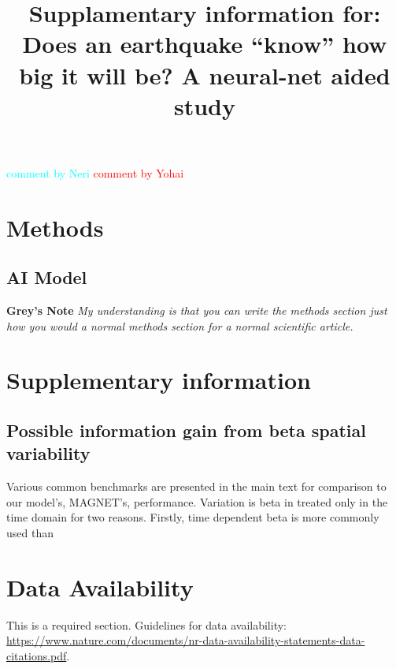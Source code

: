 \documentclass[pdflatex]{sn-jnl}
\newcommand{\yohai}[1]{{\textcolor{red}{#1}}}
\newcommand{\neri}[1]{{\textcolor{cyan}{#1}}}
\begin{document}
\title[Running Title]{Supplamentary information for: Does an earthquake “know” how big it will be? A neural-net aided study} %

\keywords{}

\maketitle

\neri{comment by Neri} \newline
\yohai{comment by Yohai}

\section{Methods}
\subsection{AI Model}
\textbf{Grey's Note} \textit{My understanding is that you can write the methods section just how you would a normal methods section for a normal scientific article.}

\section{Supplementary information}
\subsection{Possible information gain from beta spatial variability}
Various common benchmarks are presented in the main text for comparison to our model's, MAGNET's, performance. Variation is beta in treated only in the time domain for two reasons. Firstly, time dependent beta is more commonly used than 


\section*{Data Availability}
This is a required section. Guidelines for data availability: \url{https://www.nature.com/documents/nr-data-availability-statements-data-citations.pdf}.
\end{document}
